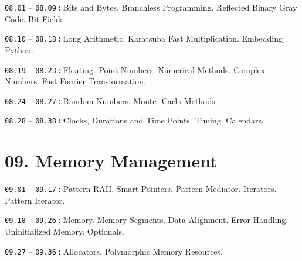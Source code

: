 \documentclass[a4paper,12pt]{article}
\renewenvironment{itemize}
{
    \begin{list}{\labelitemi}
    {
      \setlength{\topsep}{0pt}
      \setlength{\partopsep}{0pt}
      \setlength{\parskip}{0pt}
      \setlength{\itemsep}{0pt}
      \setlength{\parsep}{0pt}
      \setlength{\leftmargin}{14.5pt}
    }
}{\end{list}}
\begin{document}
\begin{itemize}

    \item \texttt{08.01} -- \texttt{08.09}\,\texttt{:}\,Bits and Bytes. Branchless Programming. Reflected Binary Gray Code. Bit Fields. 

    \smallskip

    \item \texttt{08.10} -- \texttt{08.18}\,\texttt{:}\,Long Arithmetic. Karatsuba Fast Multiplication. Embedding Python.

    \smallskip

    \item \texttt{08.19} -- \texttt{08.23}\,\texttt{:}\,Floating\,-\,Point Numbers. Numerical Methods. Complex Numbers. Fast Fourier Transformation.

    \smallskip

    \item \texttt{08.24} -- \texttt{08.27}\,\texttt{:}\,Random Numbers. Monte\,-\,Carlo Methods.

    \smallskip

    \item \texttt{08.28} -- \texttt{08.38}\,\texttt{:}\,Clocks, Durations and Time Points. Timing. Calendars.
    
\end{itemize}

\section{09. Memory Management}

\begin{itemize}

    \item \texttt{09.01} -- \texttt{09.17}\,\texttt{:}\,Pattern RAII. Smart Pointers. Pattern Mediator. Iterators. Pattern Iterator.

    \smallskip

    \item \texttt{09.18} -- \texttt{09.26}\,\texttt{:}\,Memory. Memory Segments. Data Alignment. Error Handling. Uninitialized Memory. Optionals.

    \smallskip

    \item \texttt{09.27} -- \texttt{09.36}\,\texttt{:}\,Allocators. Polymorphic Memory Resources.
    
\end{itemize}
\end{document}
